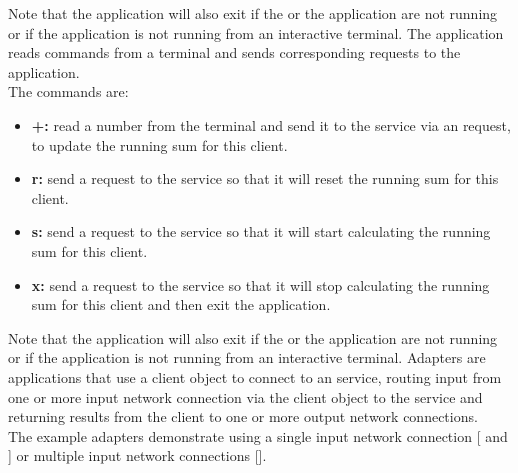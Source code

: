 Note that the application will also exit if the
 or the
 application are not running or if the
application is not running from an interactive terminal.
The  application reads commands from a
terminal and sends corresponding requests to the
 application.\\

The commands are:
\begin{itemize}
\item \textbf{+:} read a number from the terminal and send it to the service via an
 request, to update the running sum for this
client.
\item \textbf{r:} send a  request to the
service so that it will reset the running sum for this client.
\item \textbf{s:} send a  request to the
service so that it will start calculating the running sum for this client.
\item \textbf{x:} send a  request to the
service so that it will stop calculating the running sum for this client and then exit the
application.
\end{itemize}

Note that the application will also exit if the
 or the
 application are not running or if the
application is not running from an interactive terminal.
\secondaryEnd{}
Adapters are applications that use a client object to connect to an \mplusm{} service,
routing input from one or more input \yarp{} network connection via the client object to
the service and returning results from the client to one or more output \yarp{} network
connections.\\

The example adapters demonstrate using a single input \yarp{} network connection
[ and
] or multiple input \yarp{} network
connections [].\\

